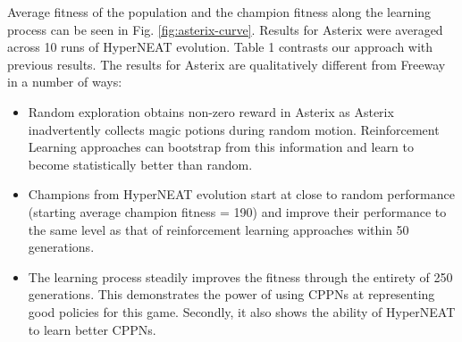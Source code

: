 \documentclass{acm_proc_article-sp}
\begin{document}
Average fitness of the population and the champion fitness along the learning process can be seen in Fig. \ref{fig:asterix-curve}. Results for Asterix were averaged across 10 runs of HyperNEAT evolution. Table 1 contrasts our approach with previous results. The results for Asterix are qualitatively different from Freeway in a number of ways:
\begin{itemize}
\item
Random exploration obtains non-zero reward in Asterix as Asterix inadvertently collects magic potions during random motion. Reinforcement Learning approaches can bootstrap from this information and learn to become statistically better than random.
\item
Champions from HyperNEAT evolution start at close to random performance (starting average champion fitness = 190) and improve their performance to the same level as that of reinforcement learning approaches within 50 generations. 
\item
The learning process steadily improves the fitness through the entirety of 250 generations. This demonstrates the power of using CPPNs at representing good policies for this game. Secondly, it also shows the ability of HyperNEAT to learn better CPPNs.
\end{itemize}

\end{document}
